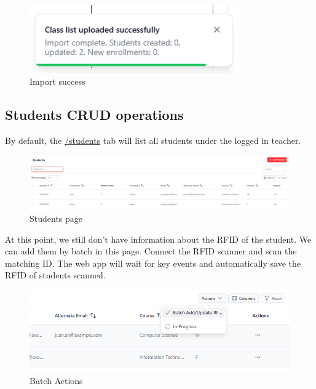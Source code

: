 \begin{figure}[h] %
	\centering
	\includegraphics[width=0.8\textwidth]{figures/chapter4/faculty_import_success.png} %
	\caption{Import success}
	\label{fig:faculty_import_success}
\end{figure}
\clearpage
\subsection{Students CRUD operations}
By default, the \url{/students} tab will list all students under the logged in teacher.
\begin{figure}[h] %
	\centering
	\includegraphics[width=1\textwidth]{figures/chapter4/student_list.png} %
	\caption{Students page}
	\label{fig:student_list}
\end{figure}
At this point, we still don't have information about the RFID of the student. We can add them by batch in this page. Connect the RFID scanner and scan the matching ID. The web app will wait for key events and automatically save the RFID of students scanned.
\begin{figure}[h] %
	\centering
	\includegraphics[width=1\textwidth]{figures/chapter4/batch_rfid.png} %
	\caption{Batch Actions}
	\label{fig:batch_rfid}
\end{figure}
